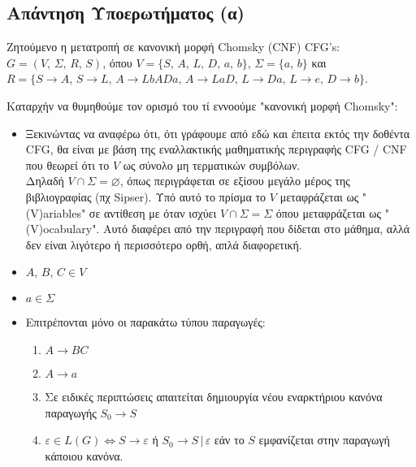 \subsection{Απάντηση Υποερωτήματος (α)}
\label{ssec:Solution_4.1}
\doublespacing

Ζητούμενο η μετατροπή σε κανονική μορφή Chomsky (CNF) CFG's:\\
 $G = (V,\, \Sigma,\, R,\, S)$, όπου $V=\{S,\,A,\,L,\,D,\,a,\,b\}$, $\Sigma=\{a,\,b\}$ και \\
$R=\{S\rightarrow A,\,S\rightarrow L,\,A\rightarrow LbADa,\,A\rightarrow LaD,\,L\rightarrow Da,\,L\rightarrow
e,\,D\rightarrow b\}$.

\par
Καταρχήν να θυμηθούμε τον ορισμό του τί εννοούμε "κανονική μορφή Chomsky":

\begin{itemize}
	\itemsep0em

	\item Ξεκινώντας να αναφέρω ότι, ότι γράφουμε από εδώ και έπειτα εκτός την δοθέντα CFG, θα είναι με βάση της
	εναλλακτικής μαθηματικής περιγραφής CFG / CNF που θεωρεί ότι το $V$ ως σύνολο μη τερματικών συμβόλων.\\
	Δηλαδή $V\cap\Sigma = \varnothing$, όπως περιγράφεται σε εξίσου μεγάλο μέρος της βιβλιογραφίας (πχ Sipser). Υπό
	αυτό το πρίσμα το $V$ μεταφράζεται ως "(V)ariables" σε αντίθεση με όταν ισχύει $V\cap\Sigma = \Sigma$ όπου
	μεταφράζεται ως "(V)ocabulary". Αυτό διαφέρει από την περιγραφή που δίδεται στο μάθημα, αλλά δεν είναι λιγότερο
	ή περισσότερο ορθή, απλά διαφορετική.

	\item $A,\, B,\, C \in V$

	\item $a \in \Sigma$

	\item Επιτρέπονται μόνο οι παρακάτω τύπου παραγωγές:
		\begin{enumerate}
			\item $A\rightarrow BC$

			\item $A\rightarrow a$

			\item Σε ειδικές περιπτώσεις απαιτείται δημιουργία νέου εναρκτήριου κανόνα παραγωγής $S_0\rightarrow S$

			\item $\varepsilon \in L(G) \Leftrightarrow S\rightarrow \varepsilon$ ή $S_0\rightarrow S \,|\,
			\varepsilon$ εάν το $S$ εμφανίζεται στην παραγωγή κάποιου κανόνα.
		\end{enumerate}

\end{itemize}



